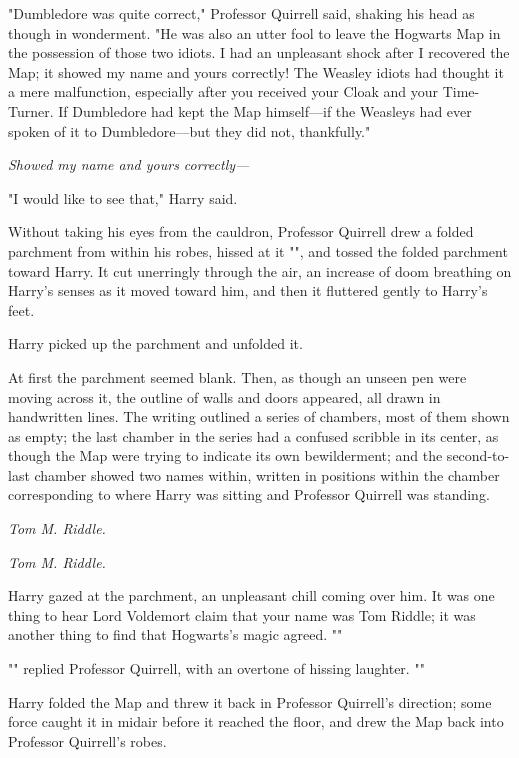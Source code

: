 "Dumbledore was quite correct," Professor Quirrell said, shaking his head as
though in wonderment. "He was also an utter fool to leave the Hogwarts Map in
the possession of those two idiots. I had an unpleasant shock after I recovered
the Map; it showed my name and yours correctly! The Weasley idiots had thought
it a mere malfunction, especially after you received your Cloak and your
Time-Turner. If Dumbledore had kept the Map himself---if the Weasleys had ever
spoken of it to Dumbledore---but they did not, thankfully."

\emph{Showed my name and yours correctly---}

"I would like to see that," Harry said.

Without taking his eyes from the cauldron, Professor Quirrell drew a folded
parchment from within his robes, hissed at it "", and tossed the folded parchment toward Harry. It cut
unerringly through the air, an increase of doom breathing on Harry's senses as
it moved toward him, and then it fluttered gently to Harry's feet.

Harry picked up the parchment and unfolded it.

At first the parchment seemed blank. Then, as though an unseen pen were moving
across it, the outline of walls and doors appeared, all drawn in handwritten
lines. The writing outlined a series of chambers, most of them shown as empty;
the last chamber in the series had a confused scribble in its center, as though
the Map were trying to indicate its own bewilderment; and the second-to-last
chamber showed two names within, written in positions within the chamber
corresponding to where Harry was sitting and Professor Quirrell was standing.

\emph{Tom M. Riddle.}

\emph{Tom M. Riddle.}

Harry gazed at the parchment, an unpleasant chill coming over him. It was one
thing to hear Lord Voldemort claim that your name was Tom Riddle; it was
another thing to find that Hogwarts's magic agreed. ""

"" replied Professor Quirrell, with an overtone of
hissing laughter. ""

Harry folded the Map and threw it back in Professor Quirrell's direction; some
force caught it in midair before it reached the floor, and drew the Map back
into Professor Quirrell's robes.

